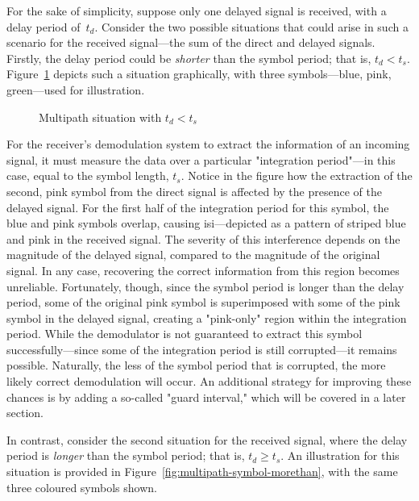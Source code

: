 \documentclass[class=report,11pt,crop=false]{standalone}
\begin{document}
For the sake of simplicity, suppose only one delayed signal is received, with a delay period of~\(t_d\). Consider the two possible situations that could arise in such a scenario for the received signal---the sum of the direct and delayed signals. Firstly, the delay period could be \emph{shorter} than the symbol period; that is, \(t_d < t_s\). Figure~\ref{fig:multipath-symbol-lessthan} depicts such a situation graphically, with three symbols---blue, pink, green---used for illustration.

\begin{figure}[htbp]
    \centering
    \captionsetup{type=figure}
    \def\svgwidth{0.8\linewidth}
    { %
        }
    \caption{Multipath situation with \(t_d < t_s\)}
    \label{fig:multipath-symbol-lessthan}
\end{figure}

For the receiver's demodulation system to extract the information of an incoming signal, it must measure the data over a particular "integration period"---in this case, equal to the symbol length, \(t_s\). Notice in the figure how the extraction of the second, pink symbol from the direct signal is affected by the presence of the delayed signal. For the first half of the integration period for this symbol, the blue and pink symbols overlap, causing \gls{isi}---depicted as a pattern of striped blue and pink in the received signal. The severity of this interference depends on the magnitude of the delayed signal, compared to the magnitude of the original signal. In any case, recovering the correct information from this region becomes unreliable. Fortunately, though, since the symbol period is longer than the delay period, some of the original pink symbol is superimposed with some of the pink symbol in the delayed signal, creating a "pink-only" region within the integration period. While the demodulator is not guaranteed to extract this symbol successfully---since some of the integration period is still corrupted---it remains possible. Naturally, the less of the symbol period that is corrupted, the more likely correct demodulation will occur. An additional strategy for improving these chances is by adding a so-called "guard interval," which will be covered in a later section.

In contrast, consider the second situation for the received signal, where the delay period is \emph{longer} than the symbol period; that is, \(t_d \ge t_s\). An illustration for this situation is provided in Figure~\ref{fig:multipath-symbol-morethan}, with the same three coloured symbols shown.
\end{document}

